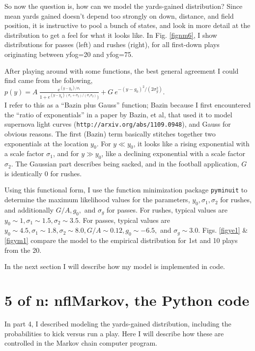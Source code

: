 \documentclass{article}
\begin{document}
So now the question is, how can we model the yards-gained distribution? Since mean yards gained doesn't depend too strongly on down, distance, and field position, it is instructive to pool a bunch of states, and look in more detail at the distribution to get a feel for what it looks like. In Fig. \ref{fignm6}, I show distributions for passes (left) and rushes (right), for all first-down plays originating between yfog=20 and yfog=75. 



After playing around with some functions, the best general agreement I could find came from the following,  \\

$ p(y) = A ~\frac{e^{(y-y_0)/\sigma_1}} {1+e^{(y-y_0) (\sigma_1+\sigma_2)/(\sigma_1 \sigma_2)})} + G ~e^{- (y-g_0)^2/ (2 \sigma_g^2)}$. \\

I refer to this as a ``Bazin plus Gauss'' function; Bazin because I first encountered the ``ratio of exponentials'' in a paper by Bazin, et al, that used it to model supernova light curves ({\tt http://arxiv.org/abs/1109.0948}), and Gauss for obvious reasons. The first (Bazin) term basically stitches together two exponentials at the location $y_0$. For $y \ll y_0$, it looks like a rising exponential with a scale factor $\sigma_1$, and for $y \gg y_0$, like a declining exponential with a scale factor $\sigma_2$. The Gaussian part describes being sacked, and in the football application, $G$ is identically 0 for rushes. 

Using this functional form, I use the function minimization package {\tt pyminuit} to determine the maximum likelihood values for the parameters, $y_0, \sigma_1, \sigma_2$ for rushes, and additionally $G/A, g_0,$ and $\sigma_g$ for passes. For rushes, typical values are $y_0 \sim 1, \sigma_1 \sim 1.5, \sigma_2 \sim 3.5$. For passes, typical values are $y_0 \sim 4.5, \sigma_1 \sim 1.8, \sigma_2 \sim 8.0, G/A \sim 0.12, g_0 \sim -6.5, $ and $\sigma_g \sim 3.0$. Figs. \ref{figye1} \& \ref{figym1} compare the model to the empirical distribution for 1st and 10 plays from the 20.

In the next section I will describe how my model is implemented in code.


\section{5 of n: nflMarkov, the Python code}

In part 4, I described modeling the yards-gained distribution, including the probabilities to kick versus run a play. Here I will describe how these are controlled in the Markov chain computer program. 
\end{document}

